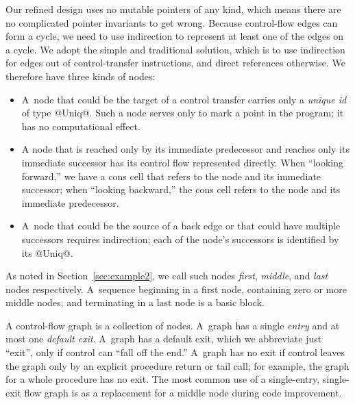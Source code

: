 \documentclass[blockstyle,preprint,nocopyrightspace]{sigplanconf}
\newcommand\secref[1]{Section~\ref{sec:#1}}
\begin{document}
Our refined design uses no mutable pointers of any kind, which means
there are no complicated pointer invariants to get wrong.
Because control-flow edges can form a cycle, we need to use 
indirection to represent at least one of the edges on a cycle.
We adopt the simple and traditional solution, which is to use
indirection for edges out of control-transfer instructions, and direct
references otherwise.
We therefore have three kinds of nodes:
\begin{itemize}
\item
A~node that could be the target of a control transfer carries only
a \emph{unique id} of type @Uniq@.
Such a node serves only to mark a point in the
program; it has no computational effect.
\item
A node that is reached only by its immediate predecessor and reaches
only its immediate successor has its control flow represented
directly. 
When ``looking forward,'' we have a cons cell that refers to the node
and its immediate successor;
when ``looking backward,'' the cons cell refers to the node
and its immediate predecessor.
\item
A~node that could be the source of a back edge or that could
have multiple successors requires indirection;
each of the node's
successors is identified by its @Uniq@.
\end{itemize}
As noted in \secref{example2},
we call such nodes \emph{first}, \emph{middle}, and \emph{last} nodes
respectively.
A~sequence beginning in a first node, containing zero or more middle
nodes, and terminating in a last node is a basic block.

A control-flow graph is a collection of nodes.
A~graph has a single \emph{entry} and at most one \emph{default exit}.
A~graph has a default exit, which we abbreviate just ``exit'', only if
control can ``fall off the end.'' 
A~graph has no exit if control leaves the graph only by an explicit
procedure return or tail call;
for example, the graph for a whole procedure  has no exit.
The most common use of a single-entry, single-exit flow graph is as a
replacement for a middle node during code improvement.
\end{document}
